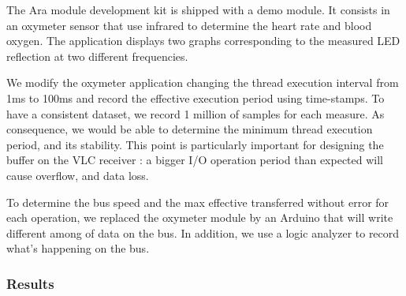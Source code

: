 The Ara module development kit is shipped with a demo module. It consists in an oxymeter sensor that use infrared to determine the heart rate and blood oxygen. The application displays two graphs corresponding to the measured LED reflection at two different frequencies.

We modify the oxymeter application changing the thread execution interval from 1ms to 100ms and record the effective execution period using time-stamps. To have a consistent dataset, we record 1 million of samples for each measure. As consequence, we would be able to determine the minimum thread execution period, and its stability.
This point is particularly important for designing the buffer on the VLC receiver : a bigger I/O operation period than expected will cause overflow, and data loss.

To determine the bus speed and the max effective transferred without error for each operation, we replaced the oxymeter module by an Arduino that will write different among of data on the bus. In addition, we use a logic analyzer to record what's happening on the bus.

\subsubsection{Results}

